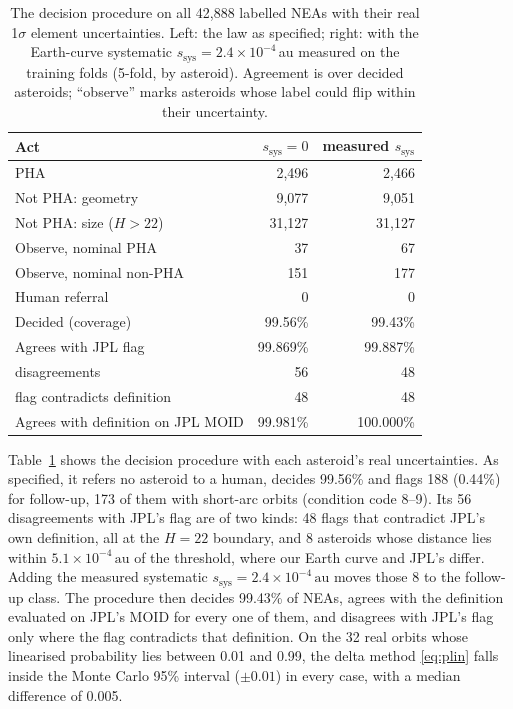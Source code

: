 \documentclass[make,article,submit,moreauthors]{Definitions/mdpi}
\newcommand{\au}{\,\mathrm{au}}
\begin{document}
\begin{table}[t]
\centering
\footnotesize
\caption{The decision procedure on all 42,888 labelled NEAs with their real 1$\sigma$ element uncertainties. Left: the law as specified; right: with the Earth-curve systematic $s_{\mathrm{sys}} = 2.4\times10^{-4}$\,au measured on the training folds (5-fold, by asteroid). Agreement is over decided asteroids; ``observe'' marks asteroids whose label could flip within their uncertainty.}
\label{tab:decision}
\setlength{\tabcolsep}{3pt}
\begin{tabular}{@{}lrr@{}}
\toprule
Act & $s_{\mathrm{sys}} = 0$ & measured $s_{\mathrm{sys}}$ \\
\midrule
PHA & 2,496 & 2,466 \\
Not PHA: geometry & 9,077 & 9,051 \\
Not PHA: size ($H > 22$) & 31,127 & 31,127 \\
Observe, nominal PHA & 37 & 67 \\
Observe, nominal non-PHA & 151 & 177 \\
Human referral & 0 & 0 \\
\midrule
Decided (coverage) & 99.56\% & 99.43\% \\
Agrees with JPL flag & 99.869\% & 99.887\% \\
\quad disagreements & 56 & 48 \\
\quad flag contradicts definition & 48 & 48 \\
Agrees with definition on JPL MOID & 99.981\% & 100.000\% \\
\bottomrule
\end{tabular}
\end{table}


Table~\ref{tab:decision} shows the decision procedure with each asteroid's real uncertainties. As specified, it refers no asteroid to a human, decides 99.56\% and flags 188 (0.44\%) for follow-up, 173 of them with short-arc orbits (condition code 8--9). Its 56 disagreements with JPL's flag are of two kinds: 48 flags that contradict JPL's own definition, all at the $H = 22$ boundary, and 8 asteroids whose distance lies within $5.1\times10^{-4}\au$ of the threshold, where our Earth curve and JPL's differ. Adding the measured systematic $s_{\mathrm{sys}} = 2.4\times10^{-4}\au$ moves those 8 to the follow-up class. The procedure then decides 99.43\% of NEAs, agrees with the definition evaluated on JPL's MOID for every one of them, and disagrees with JPL's flag only where the flag contradicts that definition. On the 32 real orbits whose linearised probability lies between 0.01 and 0.99, the delta method \eqref{eq:plin} falls inside the Monte Carlo 95\% interval ($\pm0.01$) in every case, with a median difference of 0.005.
\end{document}
